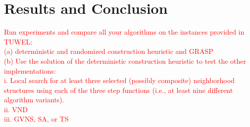 \section{Results and Conclusion}

\textcolor{red}{
Run experiments and compare all your algorithms on the instances provided in TUWEL:\\
(a) deterministic and randomized construction heuristic and GRASP\\
(b) Use the solution of the deterministic construction heuristic to test the other implementations:\\
i. Local search for at least three selected (possibly composite) neighborhood structures using
each of the three step functions (i.e., at least nine different algorithm variants).\\
ii. VND\\
iii. GVNS, SA, or TS}